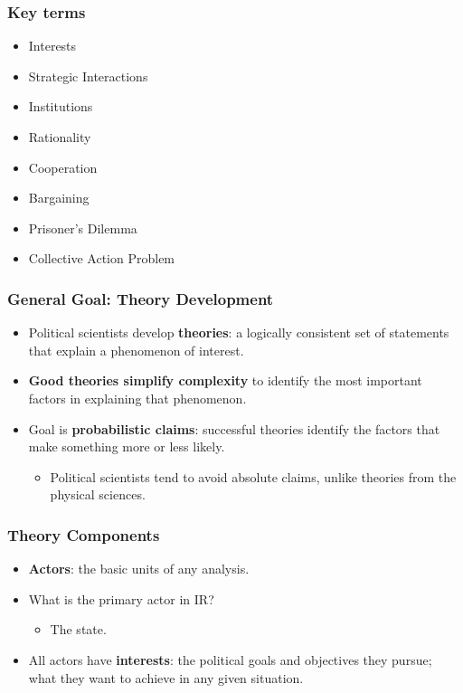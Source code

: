 \documentclass{beamer}
\begin{document}
\begin{frame} 
	\frametitle{\LARGE{Key terms}}
	\begin{itemize}
		\item Interests
		\item Strategic Interactions
		\item Institutions
		\item Rationality
		\item Cooperation
		\item Bargaining
		\item Prisoner's Dilemma
		\item Collective Action Problem
	\end{itemize}
\end{frame}

\begin{frame} 
	\frametitle{\LARGE{General Goal: Theory Development}}
	\begin{itemize}
		\item Political scientists develop \textbf{theories}: a logically consistent set of statements that explain a phenomenon of interest. \pause
		\item \textbf{Good theories simplify complexity} to identify the most important factors in explaining that phenomenon. \pause
		\item Goal is \textbf{probabilistic claims}: successful theories identify the factors that make something more or less likely. 
		\begin{itemize}
			\item Political scientists tend to avoid absolute claims, unlike theories from the physical sciences.
		\end{itemize}	
	\end{itemize}
\end{frame}

\begin{frame} 
	\frametitle{\LARGE{Theory Components}}
	\begin{itemize}
		\item \textbf{Actors}: the basic units of any analysis.  \pause
		\item What is the primary actor in IR? \pause
		\begin{itemize}
			\item The state.
		\end{itemize}
		\item All actors have \textbf{interests}: the political goals and objectives they pursue; what they want to achieve in any given situation.
	\end{itemize}
\end{frame}
\end{document}
